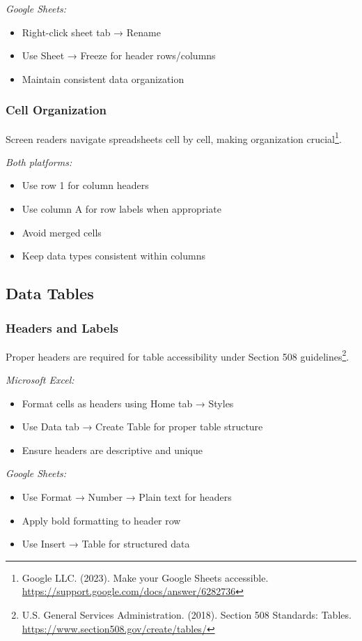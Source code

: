 \emph{Google Sheets:}
\begin{itemize}
\item Right-click sheet tab → Rename
\item Use Sheet → Freeze for header rows/columns
\item Maintain consistent data organization
\end{itemize}

\subsubsection{Cell Organization}
Screen readers navigate spreadsheets cell by cell, making organization crucial\footnote{Google LLC. (2023). Make your Google Sheets accessible. \url{https://support.google.com/docs/answer/6282736}}.

\emph{Both platforms:}
\begin{itemize}
\item Use row 1 for column headers
\item Use column A for row labels when appropriate
\item Avoid merged cells
\item Keep data types consistent within columns
\end{itemize}

\subsection{Data Tables}

\subsubsection{Headers and Labels}
Proper headers are required for table accessibility under Section 508 guidelines\footnote{U.S. General Services Administration. (2018). Section 508 Standards: Tables. \url{https://www.section508.gov/create/tables/}}.

\emph{Microsoft Excel:}
\begin{itemize}
\item Format cells as headers using Home tab → Styles
\item Use Data tab → Create Table for proper table structure
\item Ensure headers are descriptive and unique
\end{itemize}

\emph{Google Sheets:}
\begin{itemize}
\item Use Format → Number → Plain text for headers
\item Apply bold formatting to header row
\item Use Insert → Table for structured data
\end{itemize}

